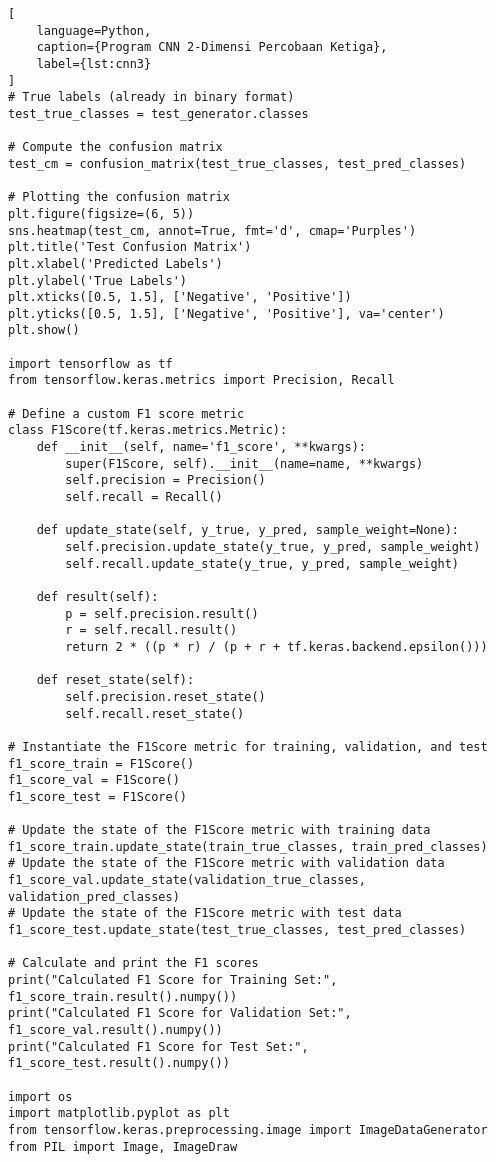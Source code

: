\begin{lstlisting}[
    language=Python,
    caption={Program CNN 2-Dimensi Percobaan Ketiga},
    label={lst:cnn3}
]
# True labels (already in binary format)
test_true_classes = test_generator.classes

# Compute the confusion matrix
test_cm = confusion_matrix(test_true_classes, test_pred_classes)

# Plotting the confusion matrix
plt.figure(figsize=(6, 5))
sns.heatmap(test_cm, annot=True, fmt='d', cmap='Purples')
plt.title('Test Confusion Matrix')
plt.xlabel('Predicted Labels')
plt.ylabel('True Labels')
plt.xticks([0.5, 1.5], ['Negative', 'Positive'])
plt.yticks([0.5, 1.5], ['Negative', 'Positive'], va='center')
plt.show()

import tensorflow as tf
from tensorflow.keras.metrics import Precision, Recall

# Define a custom F1 score metric
class F1Score(tf.keras.metrics.Metric):
    def __init__(self, name='f1_score', **kwargs):
        super(F1Score, self).__init__(name=name, **kwargs)
        self.precision = Precision()
        self.recall = Recall()

    def update_state(self, y_true, y_pred, sample_weight=None):
        self.precision.update_state(y_true, y_pred, sample_weight)
        self.recall.update_state(y_true, y_pred, sample_weight)

    def result(self):
        p = self.precision.result()
        r = self.recall.result()
        return 2 * ((p * r) / (p + r + tf.keras.backend.epsilon()))

    def reset_state(self):
        self.precision.reset_state()
        self.recall.reset_state()

# Instantiate the F1Score metric for training, validation, and test
f1_score_train = F1Score()
f1_score_val = F1Score()
f1_score_test = F1Score()

# Update the state of the F1Score metric with training data
f1_score_train.update_state(train_true_classes, train_pred_classes)
# Update the state of the F1Score metric with validation data
f1_score_val.update_state(validation_true_classes, validation_pred_classes)
# Update the state of the F1Score metric with test data
f1_score_test.update_state(test_true_classes, test_pred_classes)

# Calculate and print the F1 scores
print("Calculated F1 Score for Training Set:", f1_score_train.result().numpy())
print("Calculated F1 Score for Validation Set:", f1_score_val.result().numpy())
print("Calculated F1 Score for Test Set:", f1_score_test.result().numpy())

import os
import matplotlib.pyplot as plt
from tensorflow.keras.preprocessing.image import ImageDataGenerator
from PIL import Image, ImageDraw


\end{lstlisting}
